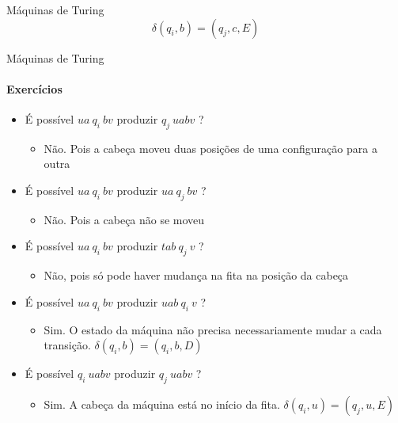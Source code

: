 \documentclass{beamer}
\begin{document}
\begin{frame}{Máquinas de Turing}
	\begin{equation*}
		\delta(q_{i}, b) = (q_{j}, c, E)
	\end{equation*}
	\begin{center}
		\renewcommand{\TuringInput} {u,a,b,v,$\sqcup$}
		\renewcommand{\TuringHead} 3
		\renewcommand{\TuringState} {$q_{i}$}
		\renewcommand{\TuringRightEnd} {$\ldots$}
		\renewcommand{\TuringLeftEnd} {}
		\TuringMachine
	\end{center}
	\begin{center}
		\renewcommand{\TuringInput} {u,a,c,v,$\sqcup$}
		\renewcommand{\TuringHead} 2
		\renewcommand{\TuringState} {$q_{j}$}
		\renewcommand{\TuringRightEnd} {$\ldots$}
		\renewcommand{\TuringLeftEnd} {}
		\TuringMachine
	\end{center}
\end{frame}
\begin{frame}{Máquinas de Turing}
	\framesubtitle{Exercícios}
	\begin{itemize}
		\item É possível $ua\ q_{i}\ bv$ produzir $q_{j}\ uabv$ ?
		\pause
		\begin{itemize}
			\item Não. Pois a cabeça moveu duas posições de uma configuração para a outra
		\end{itemize}
		\pause
		\item É possível $ua\ q_{i}\ bv$ produzir $ua\ q_{j}\ bv$ ?
		\pause
		\begin{itemize}
			\item Não. Pois a cabeça não se moveu
		\end{itemize}
		\pause
		\item É possível $ua\ q_{i}\ bv$ produzir $tab\ q_{j}\ v$ ?
		\pause
		\begin{itemize}
			\item Não, pois só pode haver mudança na fita na posição da cabeça
		\end{itemize}
		\pause
		\item É possível $ua\ q_{i}\ bv$ produzir $uab\ q_{i}\ v$ ?
		\pause
		\begin{itemize}
			\item Sim. O estado da máquina não precisa necessariamente mudar a cada transição. \pause $\delta(q_{i}, b) = (q_{i}, b, D)$
		\end{itemize}
		\pause
		\item É possível $q_{i}\ uabv$ produzir $q_{j}\ uabv$ ?
		\pause
		\begin{itemize}
			\item Sim. A cabeça da máquina está no início da fita. \pause $\delta(q_{i}, u) = (q_{j}, u, E)$
		\end{itemize}
	\end{itemize}
\end{frame}
\end{document}
